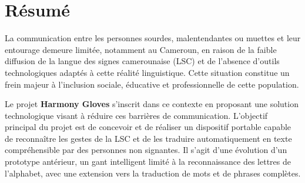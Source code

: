 \documentclass[11pt,a4paper]{report}
\newcommand{\concept}[1]{\textcolor{harmonyPrimary}{\textbf{#1}}}
\begin{document}


\chapter*{Résumé}

\begin{infobox}
La communication entre les personnes sourdes, malentendantes ou muettes et leur entourage demeure limitée, notamment au Cameroun, en raison de la faible diffusion de la langue des signes camerounaise (LSC) et de l'absence d'outils technologiques adaptés à cette réalité linguistique. Cette situation constitue un frein majeur à l'inclusion sociale, éducative et professionnelle de cette population.
\end{infobox}

\vspace{0.5cm}

Le projet \concept{Harmony Gloves} s'inscrit dans ce contexte en proposant une solution technologique visant à réduire ces barrières de communication. L'objectif principal du projet est de concevoir et de réaliser un dispositif portable capable de reconnaître les gestes de la LSC et de les traduire automatiquement en texte compréhensible par des personnes non signantes. Il s'agit d'une évolution d'un prototype antérieur, un gant intelligent limité à la reconnaissance des lettres de l'alphabet, avec une extension vers la traduction de mots et de phrases complètes.
\end{document}

